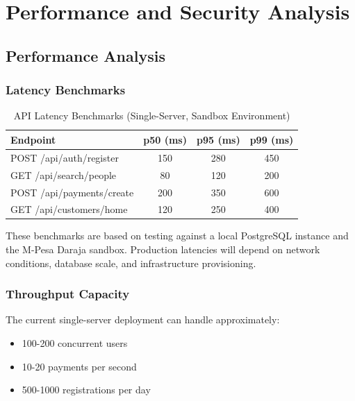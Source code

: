 \documentclass[12pt, a4paper, twoside, openright]{report}
\begin{document}

\chapter{Performance and Security Analysis}

\section{Performance Analysis}

\subsection{Latency Benchmarks}

\begin{table}[H]
    \centering
    \begin{tabularx}{\textwidth}{|l|c|c|c|}
    \hline
    \textbf{Endpoint} & \textbf{p50 (ms)} & \textbf{p95 (ms)} & \textbf{p99 (ms)} \\
    \hline
    POST /api/auth/register & 150 & 280 & 450 \\
    \hline
    GET /api/search/people & 80 & 120 & 200 \\
    \hline
    POST /api/payments/create & 200 & 350 & 600 \\
    \hline
    GET /api/customers/home & 120 & 250 & 400 \\
    \hline
    \end{tabularx}
    \caption{API Latency Benchmarks (Single-Server, Sandbox Environment)}
\end{table}

These benchmarks are based on testing against a local PostgreSQL instance and the M-Pesa Daraja sandbox. Production latencies will depend on network conditions, database scale, and infrastructure provisioning.

\subsection{Throughput Capacity}

The current single-server deployment can handle approximately:

\begin{itemize}
    \item 100-200 concurrent users
    \item 10-20 payments per second
    \item 500-1000 registrations per day
\end{itemize}
\end{document}
